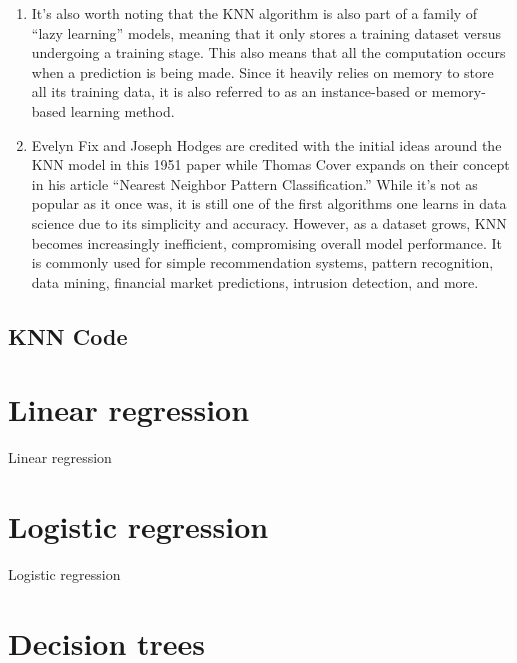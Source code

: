 \documentclass[10pt,a4paper]{article}
\begin{document}
\begin{enumerate}
    \item It's also worth noting that the KNN algorithm is also part of a family of “lazy learning” models, meaning that it only stores a training dataset versus undergoing a training stage. This also means that all the computation occurs when a prediction is being made. Since it heavily relies on memory to store all its training data, it is also referred to as an instance-based or memory-based learning method.
    
    \item Evelyn Fix and Joseph Hodges are credited with the initial ideas around the KNN model in this 1951 paper while Thomas Cover expands on their concept in his article “Nearest Neighbor Pattern Classification.” While it’s not as popular as it once was, it is still one of the first algorithms one learns in data science due to its simplicity and accuracy. However, as a dataset grows, KNN becomes increasingly inefficient, compromising overall model performance. It is commonly used for simple recommendation systems, pattern recognition, data mining, financial market predictions, intrusion detection, and more.      
\end{enumerate}
    
    \subsection{KNN Code}
    
    
    
    
\section{Linear regression}
    
    Linear regression
    
\section{Logistic regression}
    
    Logistic regression
    
\section{Decision trees}
    
\end{document}

